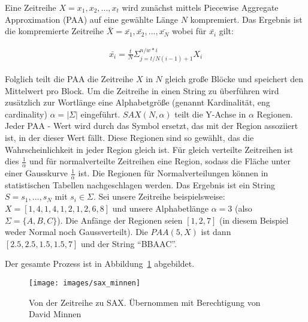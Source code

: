 Eine Zeitreihe $X = x_1, x_2, ..., x_t$ wird zunächst mittels
Piecewise Aggregate Approximation (PAA) \cite{keogh00} auf eine
gewählte Länge $N$ kompremiert. Das Ergebnis ist die kompremierte
Zeitreihe $\bar{X} = \bar{x_1}, \bar{x_2}, ..., \bar{x_N}$ wobei für
$\bar{x_i}$ gilt:

\begin{align}
\bar{x_i} = \frac{t}{N} \Sigma_{j = t / N(i-1)+1}^{n/w*i} X_i
\end{align}

Folglich teilt die PAA die Zeitreihe $X$ in $N$ gleich große Blöcke
und speichert den Mittelwert pro Block.  Um die Zeitreihe in einen
String zu überführen wird zusätzlich zur Wortlänge eine Alphabetgröße
(genannt Kardinalität, eng cardinality) $\alpha = |\Sigma|$
eingeführt. $SAX(N, \alpha)$ teilt die Y-Achse in $\alpha$
Regionen. Jeder PAA - Wert wird durch das Symbol ersetzt, das mit der
Region assoziiert ist, in der dieser Wert fällt.  Diese Regionen sind
so gewählt, das die Wahrscheinlichkeit in jeder Region gleich ist.
Für gleich verteilte Zeitreihen ist dies $\frac{1}{\alpha}$ und für
normalverteilte Zeitreihen eine Region, sodass die Fläche unter einer
Gausskurve $\frac{1}{\alpha}$ ist. Die Regionen für Normalverteilungen
können in statistischen Tabellen nachgeschlagen werden.  Das Ergebnis
ist ein String $S = s_1,..., s_N$ mit $s_i \in \Sigma$.  Sei unsere
Zeitreihe beispielsweise: $X = [1,4,1,4,1,2,1,2,6,8]$ und unsere
Alphabetlänge $\alpha = 3$ (also $\Sigma = \{A,B,C\}$).  Die Anfänge
der Regionen seien $[1,2,7]$ (in diesem Beispiel weder Normal noch
Gaussverteilt). Die $PAA(5,X)$ ist dann $[2.5,2.5,1.5,1.5,7]$ und der
String ``BBAAC''.

Der gesamte Prozess ist in Abbildung~\ref{img:sax} abgebildet.
\begin{figure}[ht] \centering
\texttt{[image: images/sax\_minnen]}
\caption{Von der Zeitreihe zu SAX. Übernommen mit Berechtigung von
David Minnen}
\label{img:sax}
\end{figure}

